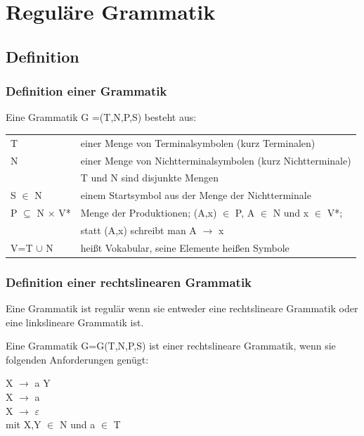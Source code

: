 \chapter{Reguläre Grammatik}

\section{Definition}

\subsection{Definition einer Grammatik}

Eine Grammatik G =(T,N,P,S) besteht aus:

\begin{tabular*}{1.0\textwidth}{l @{\extracolsep{\fill}} l}

T & einer Menge von Terminalsymbolen (kurz Terminalen)\\
N & einer Menge von Nichtterminalsymbolen (kurz Nichtterminale)\\
 & T und N sind disjunkte Mengen\\
 S $\in$ N & einem Startsymbol aus der Menge der Nichtterminale\\
 P $\subseteq$ N $\times$ V* & Menge der Produktionen; (A,x) $\in$ P, A $\in$ N
 und x $\in$ V*; \\
  & statt (A,x) schreibt man A $\rightarrow$ x\\
 V=T $\cup$ N & heißt Vokabular, seine Elemente heißen Symbole\\
 
\end{tabular*}

\subsection{Definition einer rechtslinearen Grammatik}

Eine Grammatik ist regulär wenn sie entweder eine rechtslineare Grammatik oder
eine linkslineare Grammatik ist.

Eine Grammatik G=G(T,N,P,S) ist einer rechtslineare Grammatik, wenn sie
folgenden Anforderungen genügt:

X $\rightarrow$ a Y \\
X $\rightarrow$ a \\
X $\rightarrow$ $\varepsilon$ \\
mit X,Y $\in$ N und a $\in$ T \\

